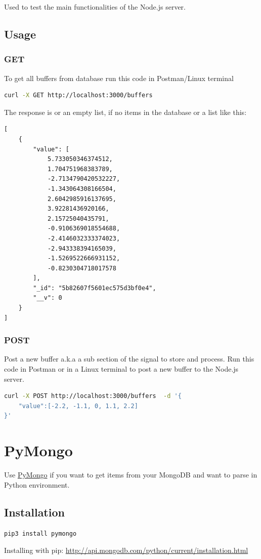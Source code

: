 \documentclass[12pt, a4paper, portrait]{article}
\begin{document}
Used to test the main functionalities of the Node.js server.

\subsection{Usage}
\subsubsection{GET}
To get all buffers from database run this code in Postman/Linux terminal
\begin{lstlisting}[language=bash, caption=Get all buffers]
curl -X GET http://localhost:3000/buffers
\end{lstlisting}

The response is or an empty list, if no items in the database or a list like this:
\begin{lstlisting}[language=XML, caption=A sub section of the signal to process]
[
    {
        "value": [
            5.733050346374512,
            1.704751968383789,
            -2.7134790420532227,
            -1.343064308166504,
            2.6042985916137695,
            3.92281436920166,
            2.15725040435791,
            -0.9106369018554688,
            -2.4146032333374023,
            -2.943338394165039,
            -1.5269522666931152,
            -0.8230304718017578
        ],
        "_id": "5b82607f5601ec575d3bf0e4",
        "__v": 0
    }
]
\end{lstlisting}

\subsubsection{POST}
Post a new buffer a.k.a a sub section of the signal to store and process. Run this code in Postman or in a Linux terminal to post a new buffer to the Node.js server.
\begin{lstlisting}[language=bash, caption=Send signal data via REST]
curl -X POST http://localhost:3000/buffers  -d '{
	"value":[-2.2, -1.1, 0, 1.1, 2.2]
}'
\end{lstlisting}

\pagebreak
\section{PyMongo}
Use \href{https://github.com/mongodb/mongo-python-driver}{PyMongo} if you want to get items from your MongoDB and want to parse in Python environment.
\subsection{Installation}
\begin{lstlisting}[language=bash]
pip3 install pymongo
\end{lstlisting}
Installing with pip: \url{http://api.mongodb.com/python/current/installation.html}
\end{document}

